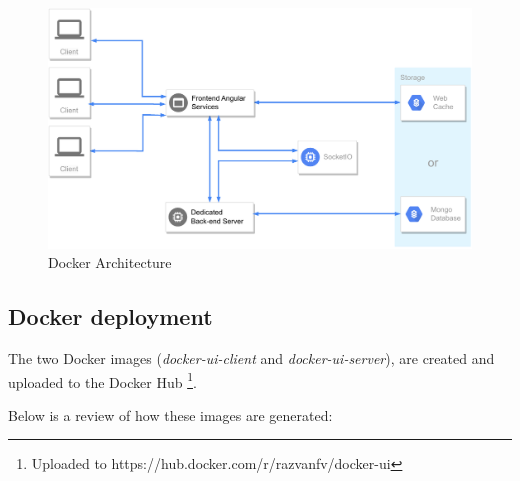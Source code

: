 \documentclass[multi, tikz, a4paper, oneside]{article}
\begin{document}
\begin{figure}[h!]
  \centering \includegraphics[scale=0.70]{diagrams/architecture.drawio.pdf}
  \caption{Docker Architecture}
  \label{fig:architecture}
\end{figure}

\subsection{Docker deployment}
The two Docker images ({\em{docker-ui-client}} and {\em{docker-ui-server}}), are
created and uploaded to the Docker Hub \footnote{Uploaded to
https://hub.docker.com/r/razvanfv/docker-ui}.

Below is a review of how these images are generated:
\end{document}
